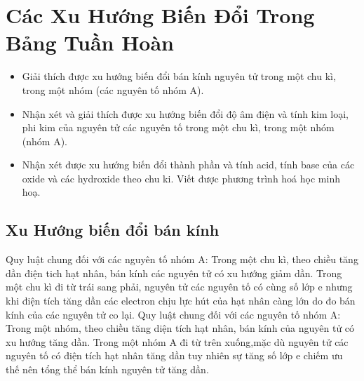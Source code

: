 \section{Các Xu Hướng Biến Đổi Trong Bảng Tuần Hoàn}
\begin{mtbh}
	\begin{itemize}
		\item Giải thích được xu hướng biến đổi bán kính nguyên tử trong một chu kì, trong một nhóm (các nguyên tố nhóm A).
		\item Nhận xét và giải thích được xu hướng biến đổi độ âm điện và tính kim loại, phi kim của nguyên tử các nguyên tố trong một chu kì, trong một nhóm (nhóm A).
		\item Nhận xét được xu hướng biến đổi thành phần và tính acid, tính base của các oxide và các hydroxide theo chu ki. Viết được phương trình hoá học minh hoạ.
	\end{itemize}
\end{mtbh}
\subsection{Xu Hướng biến đổi bán kính}
\begin{hoplythuyet}
		Quy luật chung đối với các nguyên tố nhóm A: Trong một chu kì, theo chiều tăng dần điện tich hạt nhân, bán kính các nguyên tử có xu hướng giảm dần.
	Trong một chu kì đi từ trái sang phải, nguyên tử các nguyên tố có cùng số lớp e nhưng khi điện tích tăng dần các electron chịu lực hút của hạt nhân càng lớn do đo bán kính của các nguyên tử co lại.
	Quy luật chung đối với các nguyên tố nhóm A: Trong một nhóm, theo chiều tăng diện tích hạt nhân, bán kính của nguyên tử có xu hướng tăng dần.
	Trong một nhóm A đi từ trên xuống,mặc dù nguyên tử các nguyên tố có điện tích hạt nhân tăng dần tuy nhiên sự tăng số lớp e chiếm ưu thế nên tổng thể bán kính nguyên tử tăng dần.
\end{hoplythuyet}
